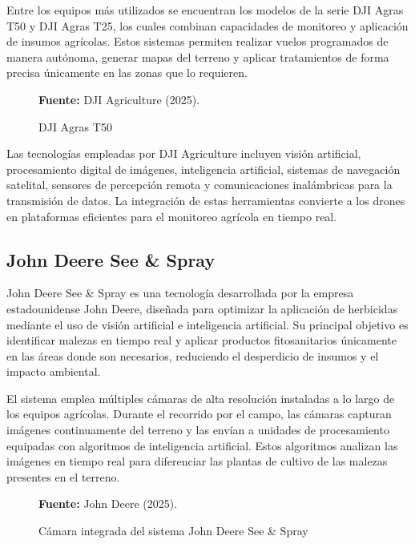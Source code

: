 Entre los equipos más utilizados se encuentran los modelos de la serie DJI Agras T50 y DJI Agras T25, los cuales combinan capacidades de monitoreo y aplicación de insumos agrícolas. Estos sistemas permiten realizar vuelos programados de manera autónoma, generar mapas del terreno y aplicar tratamientos de forma precisa únicamente en las zonas que lo requieren.

\begin{figure}[H]
    \centering
    \caption{DJI Agras T50}
    \label{fig:1_2_1}
    \vspace{0.2cm}
    \footnotesize \textbf{Fuente:} DJI Agriculture (2025).
\end{figure}

Las tecnologías empleadas por DJI Agriculture incluyen visión artificial, procesamiento digital de imágenes, inteligencia artificial, sistemas de navegación satelital, sensores de percepción remota y comunicaciones inalámbricas para la transmisión de datos. La integración de estas herramientas convierte a los drones en plataformas eficientes para el monitoreo agrícola en tiempo real.


\subsection{John Deere See \& Spray}

John Deere See \& Spray es una tecnología desarrollada por la empresa estadounidense John Deere, diseñada para optimizar la aplicación de herbicidas mediante el uso de visión artificial e inteligencia artificial. Su principal objetivo es identificar malezas en tiempo real y aplicar productos fitosanitarios únicamente en las áreas donde son necesarios, reduciendo el desperdicio de insumos y el impacto ambiental.

El sistema emplea múltiples cámaras de alta resolución instaladas a lo largo de los equipos agrícolas. Durante el recorrido por el campo, las cámaras capturan imágenes continuamente del terreno y las envían a unidades de procesamiento equipadas con algoritmos de inteligencia artificial. Estos algoritmos analizan las imágenes en tiempo real para diferenciar las plantas de cultivo de las malezas presentes en el terreno.

\begin{figure}[H]
    \centering
    \caption{Cámara integrada del sistema John Deere See \& Spray}
    \label{fig:1_2_2}
    \vspace{0.2cm}
    \footnotesize \textbf{Fuente:} John Deere (2025).
\end{figure}

